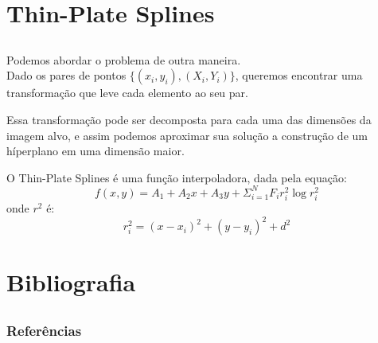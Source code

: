 \documentclass[t]{beamer}
\begin{document}


\section{Thin-Plate Splines}
\subsection{}

\begin{frame}
    Podemos abordar o problema de outra maneira. \\
    Dado os pares de pontos $\{(x_i,y_i),(X_i,Y_i)\}$, queremos encontrar uma transformação que leve cada elemento
    ao seu par.
\end{frame}

\begin{frame}
    Essa transformação pode ser decomposta para cada uma das dimensões da imagem alvo, e assim podemos
    aproximar sua solução a construção de um híperplano em uma dimensão maior.
\end{frame}

\begin{frame}
    O Thin-Plate Splines\cite{bookstein1989principal} é uma função interpoladora, dada pela equação:
    \begin{equation*}
        f(x,y) = A_1 + A_2x + A_3y + \Sigma_{i=1}^{N} F_ir_i^2 \log{r_i^2}
    \end{equation*}
    onde $r^2$ é:
    \begin{equation*}
        r^2_i = (x-x_i)^2+(y-y_i)^2+d^2
    \end{equation*}
\end{frame}

\section{Bibliografia}
\subsection{}

\begin{frame}[allowframebreaks]
  \frametitle{Referências}    
  \framesubtitle{}
  
  {}
\end{frame}
\end{document}
